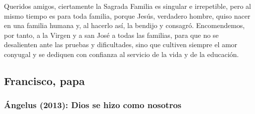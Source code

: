 \begin{body}
					Queridos amigos, ciertamente la Sagrada Familia es singular e irrepetible, pero al mismo tiempo es  para toda familia, porque Jesús, verdadero hombre, quiso nacer en una familia humana y, al hacerlo así, la bendijo y consagró. Encomendemos, por tanto, a la Virgen y a san José a todas las familias, para que no se desalienten ante las pruebas y dificultades, sino que cultiven siempre el amor conyugal y se dediquen con confianza al servicio de la vida y de la educación.					
				\end{body}
	
				
\newsection


		\subsection{Francisco, papa}
		
			\subsubsection{Ángelus (2013): Dios se hizo como nosotros}
			
				
